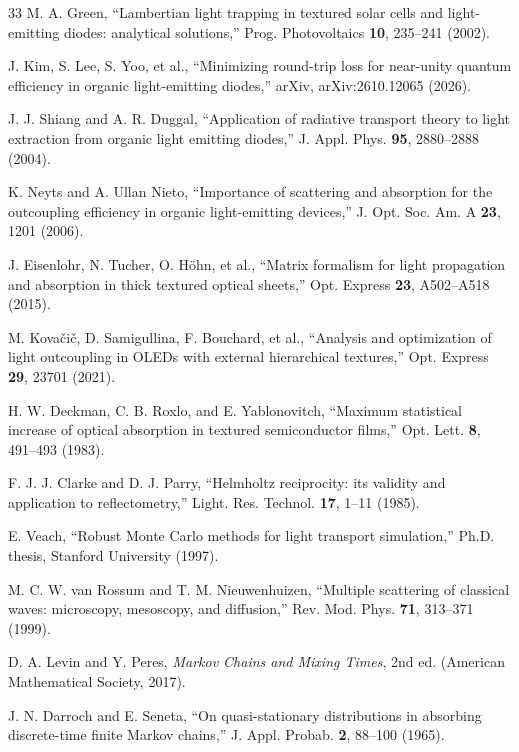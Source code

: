 \documentclass{optica-article}
\begin{document}
\begin{thebibliography}{33}
 M. A. Green, ``Lambertian light trapping in textured solar cells and light-emitting diodes: analytical solutions,'' Prog. Photovoltaics \textbf{10}, 235–241 (2002).


 J. Kim, S. Lee, S. Yoo, et al., ``Minimizing round-trip loss for near-unity quantum efficiency in organic light-emitting diodes,'' arXiv, arXiv:2610.12065 (2026).


 J. J. Shiang and A. R. Duggal, ``Application of radiative transport theory to light extraction from organic light emitting diodes,'' J. Appl. Phys. \textbf{95}, 2880–2888 (2004).


 K. Neyts and A. Ullan Nieto, ``Importance of scattering and absorption for the outcoupling efficiency in organic light-emitting devices,'' J. Opt. Soc. Am. A \textbf{23}, 1201 (2006).


 J. Eisenlohr, N. Tucher, O. Höhn, et al., ``Matrix formalism for light propagation and absorption in thick textured optical sheets,'' Opt. Express \textbf{23}, A502–A518 (2015).


 M. Kovačič, D. Samigullina, F. Bouchard, et al., ``Analysis and optimization of light outcoupling in OLEDs with external hierarchical textures,'' Opt. Express \textbf{29}, 23701 (2021).


 H. W. Deckman, C. B. Roxlo, and E. Yablonovitch, ``Maximum statistical increase of optical absorption in textured semiconductor films,'' Opt. Lett. \textbf{8}, 491–493 (1983).


 F. J. J. Clarke and D. J. Parry, ``Helmholtz reciprocity: its validity and application to reflectometry,'' Light. Res. Technol. \textbf{17}, 1–11 (1985).


 E. Veach, ``Robust Monte Carlo methods for light transport simulation,'' Ph.D. thesis, Stanford University (1997).


 M. C. W. van Rossum and T. M. Nieuwenhuizen, ``Multiple scattering of classical waves: microscopy, mesoscopy, and diffusion,'' Rev. Mod. Phys. \textbf{71}, 313–371 (1999).


 D. A. Levin and Y. Peres, \emph{Markov Chains and Mixing Times}, 2nd ed. (American Mathematical Society, 2017).


 J. N. Darroch and E. Seneta, ``On quasi-stationary distributions in absorbing discrete-time finite Markov chains,'' J. Appl. Probab. \textbf{2}, 88–100 (1965).



\end{thebibliography}
\end{document}
